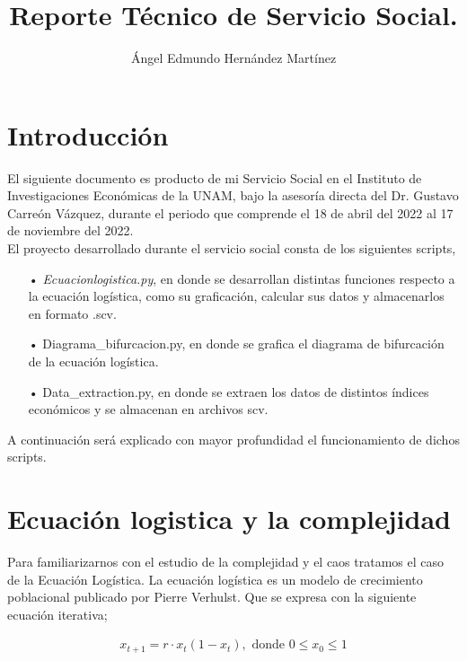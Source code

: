 \documentclass[10pt,a4paper]{article}
\author{Ángel Edmundo Hernández Martínez}
\title{Reporte Técnico de Servicio Social.}
\date{}
\begin{document}
\maketitle

\section{Introducción}

	El siguiente documento es producto de mi Servicio Social en el Instituto de Investigaciones Económicas de la UNAM, bajo la asesoría directa del Dr. Gustavo Carreón Vázquez, durante el periodo que comprende el 18 de abril del 2022 al 17 de noviembre del 2022. \\
	
	El proyecto desarrollado durante el servicio social consta de los siguientes scripts, 
	
\begin{itemize}
	
	\item[•] \textit{Ecuacionlogistica.py}, en donde se desarrollan distintas funciones respecto a la ecuación logística, como su graficación, calcular sus datos y almacenarlos en formato .scv.
	
	\item[•] Diagrama_bifurcacion.py, en donde se grafica el diagrama de bifurcación de la ecuación logística.
	
	\item[•] Data_extraction.py, en donde se extraen los datos de distintos índices económicos y se almacenan en archivos scv.
	
\end{itemize}

	A continuación será explicado con mayor profundidad el funcionamiento de dichos scripts.
	
\section{Ecuación logistica y la complejidad}

	Para familiarizarnos con el estudio de la complejidad y el caos tratamos el caso de la Ecuación Logística. 
	La ecuación logística es un modelo de crecimiento poblacional publicado por Pierre Verhulst. Que se expresa con la siguiente ecuación iterativa;
	
	\begin{align*}
	x_{t+1} =  r\cdot x_{t}(1 - x_t), \text{ donde } 0 \leq x_0 \leq 1 
	\end{align*}
	
\end{document}
